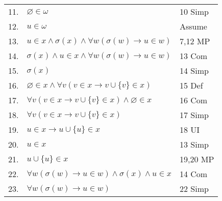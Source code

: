 \documentclass[12pt, a4paper]{article}
\begin{document}
\begin{table}[h!]
\begin{center}
\begin{tabular}{l l l}
        11.& $\varnothing\in\omega$ & 10 Simp\\
        
        12.& $u\in\omega$ & Assume\\
        
        13.& \hspace{10mm}$u\in x\wedge\sigma(x)\wedge\forall w(\sigma(w)\rightarrow u\in w)$ & 7,12 MP\\
        
        14.& \hspace{10mm}$\sigma(x)\wedge u\in x\wedge\forall w(\sigma(w)\rightarrow u\in w)$ & 13 Com\\
        
        15.& \hspace{10mm}$\sigma(x)$ & 14 Simp\\
        
        16.& \hspace{10mm}$\varnothing\in x\wedge\forall v(v\in x\rightarrow v\cup\{v\}\in x)$ & 15 Def\\
        
        17.& \hspace{10mm}$\forall v(v\in x\rightarrow v\cup\{v\}\in x)\wedge\varnothing\in x$ & 16 Com\\
        
        18.& \hspace{10mm}$\forall v(v\in x\rightarrow v\cup\{v\}\in x)$ & 17 Simp\\
        
        19.& \hspace{10mm}$u\in x\rightarrow u\cup\{u\}\in x$ & 18 UI\\
        
        20.& \hspace{10mm}$u\in x$ & 13 Simp\\
        
        21.& \hspace{10mm}$u\cup\{u\}\in x$ & 19,20 MP\\
        
        22.& \hspace{10mm}$\forall w(\sigma(w)\rightarrow u\in w)\wedge\sigma(x)\wedge u\in x$ & 14 Com\\
        
        23.& \hspace{10mm}$\forall w(\sigma(w)\rightarrow u\in w)$ & 22 Simp\\
        

\end{tabular}
\end{center}
\end{table}
\end{document}
